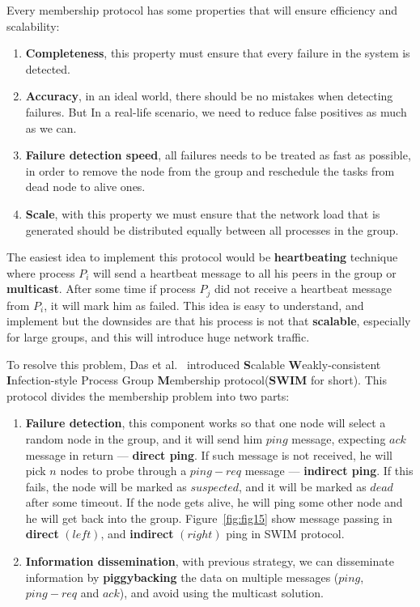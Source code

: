 Every membership protocol has some properties that will ensure efficiency and scalability:

\begin{enumerate}[start=1,label={(\bfseries \arabic*)}] \label{ds:features}
	\item \textbf{Completeness}, this property must ensure that every failure in the system is detected.
	\item \textbf{Accuracy}, in an ideal world, there should be no mistakes when detecting failures. But In a real-life scenario, we need to reduce false positives as much as we can.
	\item \textbf{Failure detection speed}, all failures needs to be treated as fast as possible, in order to remove the node from the group and reschedule the tasks from dead node to alive ones.
	\item \textbf{Scale}, with this property we must ensure that the network load that is generated should be distributed equally between all processes in the group.
\end{enumerate}

\noindent
The easiest idea to implement this protocol would be \textbf{heartbeating} technique where process $P_i$ will send a heartbeat message to all his peers in the group or \textbf{multicast}. After some time if process $P_j$ did not receive a heartbeat message from $P_i$, it will mark him as failed. This idea is easy to understand, and implement but the downsides are that his process is not that \textbf{scalable}, especially for large groups, and this will introduce huge network traffic.

To resolve this problem, Das et al.~\cite{DasGM02} introduced \textbf{S}calable \textbf{W}eakly-consistent \textbf{I}nfection-style Process Group \textbf{M}embership protocol\newline (\textbf{SWIM} for short)\label{swim}. 
\noindent
This protocol divides the membership problem into two parts:

\begin{enumerate}[start=1,label={(\bfseries \arabic*)}]
	\item \textbf{Failure detection}, this component works so that one node will select a random node in the group, and it will send him $ping$ message, expecting $ack$ message in return --- \textbf{direct ping}. If such message is not received, he will pick $n$ nodes to probe through a $ping-req$ message --- \textbf{indirect ping}. If this fails, the node will be marked as $suspected$, and it will be marked as $dead$ after some timeout. If the node gets alive, he will ping some other node and he will get back into the group. Figure~\ref{fig:fig15} show message passing in \textbf{direct} $(left)$, and \textbf{indirect} $(right)$ ping in SWIM protocol.
	\item \textbf{Information dissemination}, with previous strategy, we can disseminate information by \textbf{piggybacking} the data on multiple messages ($ping$, $ping-req$ and $ack$), and avoid using the multicast solution.
\end{enumerate}


